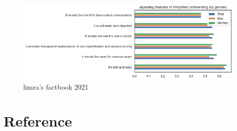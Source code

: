 \begin{figure}[htbp]
    \includegraphics[width=\linewidth]{lib/limra.png}
    \caption{limra's factbook 2021}
    \label{fig:limra}
\end{figure}
\section{Reference}
\nocite{*}
\printbibliography[heading=none]

